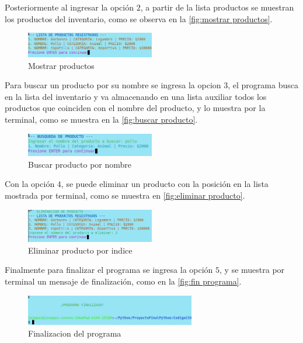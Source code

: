 \documentclass[12pt]{article}
\begin{document}
Posteriormente al ingresar la opción $2$, a partir de la lista productos se muestran los productos del inventario, como se observa en la \autoref{fig:mostrar productos}.

\begin{figure}[H]
	\centering
	\setlength{\fboxrule}{0pt}
	\includegraphics[width=0.5\textwidth]{Imagenes/mostrar_productos.png}
	\caption{Mostrar productos}
	\label{fig:mostrar productos}
\end{figure} 

Para buscar un producto por su nombre se ingresa la opcion $3$, el programa busca en la lista del inventario y va almacenando en una lista auxiliar todos los productos que coinciden con el nombre del producto, y lo muestra por la terminal, como se muestra en la \autoref{fig:buscar producto}.

\begin{figure}[H]
	\centering
	\setlength{\fboxrule}{0pt}
	\includegraphics[width=0.5\textwidth]{Imagenes/busqueda_por_nombre_producto.png}
	\caption{Buscar producto por nombre}
	\label{fig:buscar producto}
\end{figure} 

Con la opción $4$, se puede eliminar un producto con la posición en la lista mostrada por terminal, como se muestra en \autoref{fig:eliminar producto}.

\begin{figure}[H]
	\centering
	\setlength{\fboxrule}{0pt}
	\includegraphics[width=0.5\textwidth]{Imagenes/eliminar_producto.png}
	\caption{Eliminar producto por indice}
	\label{fig:eliminar producto}
\end{figure} 

Finalmente para finalizar el programa se ingresa la opción $5$, y se muestra por terminal un mensaje de finalización, como en la \autoref{fig:fin programa}.
\begin{figure}[H]
	\centering
	\setlength{\fboxrule}{0pt}
	\includegraphics[width=0.66\textwidth]{Imagenes/finalizar_programa.png}
	\caption{Finalizacion del programa}
	\label{fig:fin programa}
\end{figure} 
\end{document}
